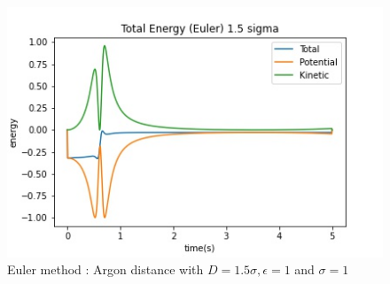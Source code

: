 \begin{figure}[h!]
        \centering 
        \includegraphics[scale=0.8]{./py/2civ_allEnergiesEuler15.jpg} 
        \caption{Euler method : Argon distance with $D = 1.5 \sigma, \epsilon = 1$ and $\sigma = 1$ }
        \label{fig:allEnergiesEuler15}
\end{figure}

